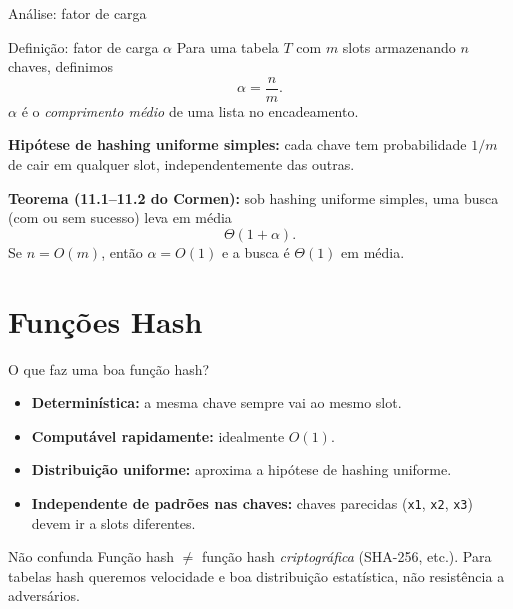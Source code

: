\documentclass[aspectratio=169]{beamer}
\begin{document}
\begin{frame}[shrink=10]{Análise: fator de carga}
\begin{block}{Definição: fator de carga $\alpha$}
Para uma tabela $T$ com $m$ slots armazenando $n$ chaves, definimos
$$\alpha = \frac{n}{m}.$$
$\alpha$ é o \emph{comprimento médio} de uma lista no encadeamento.
\end{block}
\textbf{Hipótese de hashing uniforme simples:} cada chave tem probabilidade $1/m$ de cair em qualquer slot, independentemente das outras.

\medskip
\textbf{Teorema (11.1--11.2 do Cormen):} sob hashing uniforme simples, uma busca (com ou sem sucesso) leva em média
$$\Theta(1 + \alpha).$$
Se $n = O(m)$, então $\alpha = O(1)$ e a busca é $\Theta(1)$ em média.
\end{frame}

\section{Funções Hash}

\begin{frame}{O que faz uma boa função hash?}
\begin{itemize}
\item \textbf{Determinística:} a mesma chave sempre vai ao mesmo slot.
\item \textbf{Computável rapidamente:} idealmente $O(1)$.
\item \textbf{Distribuição uniforme:} aproxima a hipótese de hashing uniforme.
\item \textbf{Independente de padrões nas chaves:} chaves parecidas (\texttt{x1}, \texttt{x2}, \texttt{x3}) devem ir a slots diferentes.
\end{itemize}
\begin{alertblock}{Não confunda}
Função hash $\neq$ função hash \emph{criptográfica} (SHA-256, etc.). Para tabelas hash queremos velocidade e boa distribuição estatística, não resistência a adversários.
\end{alertblock}
\end{frame}
\end{document}
